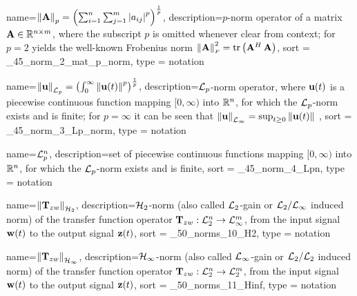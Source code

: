 {
  name={\ensuremath{ \norm{\mat{A}}_p = \left(\sum_{i = 1}^{n}\sum_{j = 1}^{m} \abs{a_{ij}}^p\right)^{\frac{1}{p}}}},
  description={$p$-norm operator of a matrix $\mathbf{A} \in \mathbb{R}^{n\times m}$, where 
                the subscript $p$ is omitted whenever clear from context; 
                for $p = 2$ yields the well-known Frobenius norm 
                $\left\|\mathbf{A}\right\|_{\scriptscriptstyle F}^2 = {\rm tr}\left(\mathbf{A}^H\,\mathbf{A}\right)$},
  sort = _45_norm_2_mat_p_norm,
  type = notation
}

{
  name={\ensuremath{ \normL{p}{\bvec{u}} = \left( \int_{0}^{\infty} \norm{\bvec{u}(t)}^p \right)^{\frac{1}{p}} }},
  description={$\mathcal{L}_p$-norm operator, where $\mathbf{u}(t)$ is a piecewise continuous 
                function mapping $[0,\infty)$ into $\mathbb{R}^n$, for which the 
                $\mathcal{L}_p$-norm exists and is finite; for $p = \infty$ it can be seen that 
                $\left\|\mathbf{u}\right\|_{\mathcal{L}_{\infty}} = \sup_{t\geq0} \left\|\mathbf{u}(t)\right\|$ },
  sort = _45_norm_3_Lp_norm,
  type = notation
}

{
  name={\ensuremath{ \set{L}_p^n }},
  description={set of piecewise continuous functions mapping $[0,\infty)$ into 
                $\mathbb{R}^n$, for which the $\mathcal{L}_p$-norm exists and is finite},
  sort = _45_norm_4_Lpn,
  type = notation
}

{
  name={\ensuremath{ \normH{2}{ \mat{T}_{zw} } }},
  description={$\mathcal{H}_2$-norm (also called $\mathcal{L}_2$-gain or 
                $\mathcal{L}_2/\mathcal{L}_\infty$ induced norm) of the transfer function operator 
                $\mathbf{T}_{zw}: \mathcal{L}_2^n \rightarrow \mathcal{L}_\infty^m$,
                from the input signal $\mathbf{w}(t)$ to the output signal $\mathbf{z}(t)$},
  sort = _50_norms_10_H2,
  type = notation
}

{
  name={\ensuremath{\normH{\infty}{ \mat{T}_{zw} } }},
  description={$\mathcal{H}_\infty$-norm (also called $\mathcal{L}_\infty$-gain or 
                $\mathcal{L}_2/\mathcal{L}_2$ induced norm) of the transfer function operator 
                $\mathbf{T}_{zw}: \mathcal{L}_2^n \rightarrow \mathcal{L}_2^m$,
                from the input signal $\mathbf{w}(t)$ to the output signal $\mathbf{z}(t)$},
  sort = _50_norms_11_Hinf,
  type = notation
}

